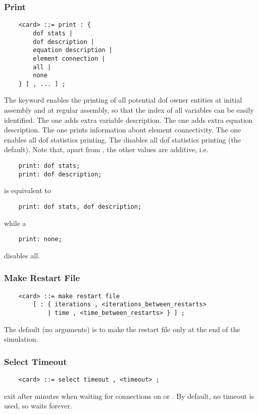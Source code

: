 \subsubsection{Print}\label{sec:CONTROLDATA:PRINT}
\begin{verbatim}
    <card> ::= print : {
        dof stats |
        dof description |
        equation description |
        element connection |
        all |
        none
    } [ , ... ] ;
\end{verbatim}
The  keyword enables the printing of all potential
dof owner entities at initial assembly and at regular assembly,
so that the index of all variables can be easily identified.
The  one adds extra variable description.
The  one adds extra equation description.
The  one prints information
about element connectivity.
The  one enables all dof statistics printing.
The  disables all dof statistics printing (the default).
Note that, apart from , the other values are additive, i.e.
\begin{verbatim}
    print: dof stats;
    print: dof description;
\end{verbatim}
is equivalent to 
\begin{verbatim}
    print: dof stats, dof description;
\end{verbatim}
while a 
\begin{verbatim}
    print: none;
\end{verbatim}
disables all.

\subsubsection{Make Restart File}
\begin{verbatim}
    <card> ::= make restart file
        [ : { iterations , <iterations_between_restarts>
            | time , <time_between_restarts> } ] ;
\end{verbatim}
The default (no arguments) is to make the restart file only at the end of
the simulation.

\subsubsection{Select Timeout}
\begin{verbatim}
    <card> ::= select timeout , <timeout> ;
\end{verbatim}
exit after  minutes when waiting for connections 
on  or .
By default, no timeout is used, so  waits forever.

